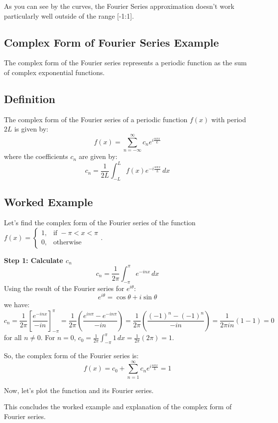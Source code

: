 \documentclass[a4paper,12pt]{article}
\begin{document}
As you can see by the curves, the Fourier Series approximation doesn't work particularly well outside of the range [-1:1].

\subsection*{Complex Form of Fourier Series Example}

The complex form of the Fourier series represents a periodic function as the sum of complex exponential functions.

\subsection*{Definition}

The complex form of the Fourier series of a periodic function \( f(x) \) with period \( 2L \) is given by:
\[
f(x) = \sum_{n=-\infty}^{\infty} c_n e^{i\frac{n\pi x}{L}}
\]
where the coefficients \( c_n \) are given by:
\[
c_n = \frac{1}{2L} \int_{-L}^{L} f(x) e^{-i\frac{n\pi x}{L}} \, dx
\]

\subsection*{Worked Example}

Let's find the complex form of the Fourier series of the function \( f(x) = \begin{cases} 1, & \text{if } -\pi < x < \pi \\ 0, & \text{otherwise} \end{cases} \).

\textbf{Step 1: Calculate \( c_n \)}
\[
c_n = \frac{1}{2\pi} \int_{-\pi}^{\pi} e^{-i n x} \, dx
\]
Using the result of the Fourier series for \( e^{i\theta} \):
\[
e^{i\theta} = \cos\theta + i\sin\theta
\]
we have:
\[
c_n = \frac{1}{2\pi} \left[ \frac{e^{-i n x}}{-in} \right]_{-\pi}^{\pi} = \frac{1}{2\pi} \left( \frac{e^{i n \pi} - e^{-i n \pi}}{-in} \right) = \frac{1}{2\pi} \left( \frac{(-1)^n - (-1)^n}{-in} \right) = \frac{1}{2\pi in} (1 - 1) = 0
\]
for all \( n \neq 0 \). For \( n = 0 \), \( c_0 = \frac{1}{2\pi} \int_{-\pi}^{\pi} 1 \, dx = \frac{1}{2\pi} (2\pi) = 1 \).

So, the complex form of the Fourier series is:
\[
f(x) = c_0 + \sum_{n=1}^{\infty} c_n e^{i\frac{n\pi x}{L}} = 1
\]

Now, let's plot the function and its Fourier series.

\begin{center}
\end{center}

This concludes the worked example and explanation of the complex form of Fourier series.

\vfill
\end{document}

